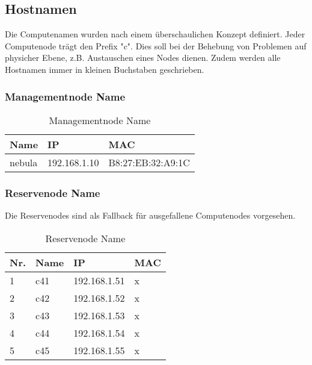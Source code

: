 \subsection{Hostnamen}
Die Computenamen wurden nach einem überschaulichen Konzept definiert. Jeder Computenode trägt den Prefix "c". Dies soll bei der Behebung von Problemen auf physicher Ebene, z.B. Austauschen eines Nodes dienen. Zudem werden alle Hostnamen immer in kleinen Buchstaben geschrieben.

\subsubsection{Managementnode Name}
\begin{table}[H]
\centering
\begin{tabular}{p{5cm}p{5.5cm}p{5.5cm}}
\hline
\rowcolor{heading} \textbf{Name} & \textbf{IP} & \textbf{MAC} \\\hline
nebula & 192.168.1.10 & B8:27:EB:32:A9:1C \\\hline
\end{tabular}
\caption{Managementnode Name}
\end{table}

\subsubsection{Reservenode Name}
Die Reservenodes sind als Fallback für ausgefallene Computenodes vorgesehen.
\begin{table}[H]
\centering
\begin{tabular}{p{1cm}p{2cm}p{6cm}p{6cm}}
\hline
\rowcolor{heading} \textbf{Nr.} & \textbf{Name} & \textbf{IP} & \textbf{MAC} \\\hline
1 & c41 & 192.168.1.51 & x\\\hline
2 & c42 & 192.168.1.52 & x\\\hline
3 & c43 & 192.168.1.53 & x\\\hline
4 & c44 & 192.168.1.54 & x\\\hline
5 & c45 & 192.168.1.55 & x\\\hline
\end{tabular}
\caption{Reservenode Name}
\end{table}

